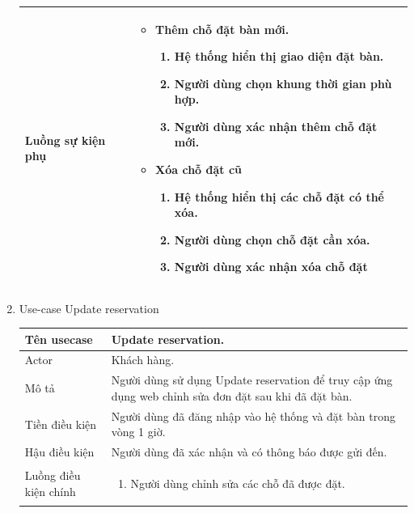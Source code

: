 \begin{enumerate}
\begin{center}{\color{black}}
\begin{tabular}{|p{5cm}|p{7cm}|}
        Luồng sự kiện phụ &  
                \begin{itemize}
                    \item Thêm chỗ đặt bàn mới.
                    \begin{enumerate}[1.]
                        \item Hệ thống hiển thị giao diện đặt bàn.
                        \item Người dùng chọn khung thời gian phù hợp.
                        \item Người dùng xác nhận thêm chỗ đặt mới.
                    \end{enumerate}
                    \item Xóa chỗ đặt cũ
                    \begin{enumerate}[1.]
                        \item Hệ thống hiển thị các chỗ đặt có thể xóa.
                        \item Người dùng chọn chỗ đặt cần xóa.
                        \item Người dùng xác nhận xóa chỗ đặt
                    \end{enumerate}
                \end{itemize}\\ \hline
    \end{tabular}
\end{center}


    \newpage
    \item Use-case Update reservation
    \begin{center}{\color{black}}
        \begin{tabular}{|p{5cm}|p{7cm}|} \hline
    
        
        Tên usecase &  Update reservation.\\ \hline
        Actor & Khách hàng.\\ \hline
        Mô tả & Người dùng sử dụng Update reservation để truy cập ứng dụng web chỉnh sửa đơn đặt sau khi đã đặt bàn.\\ \hline
        Tiền điều kiện 
        & Người dùng đã đăng nhập vào hệ thống và  đặt bàn  trong vòng 1 giờ.\\ \hline
        
        
        Hậu điều kiện &  Người dùng đã xác nhận  và có thông báo được gửi đến.
                \\ \hline
        Luồng điều kiện chính &  
            \begin{enumerate}[1.]
                \item Người dùng chỉnh sửa các chỗ đã được đặt.
                

\end{enumerate}
\end{tabular}
\end{center}
\end{enumerate}
